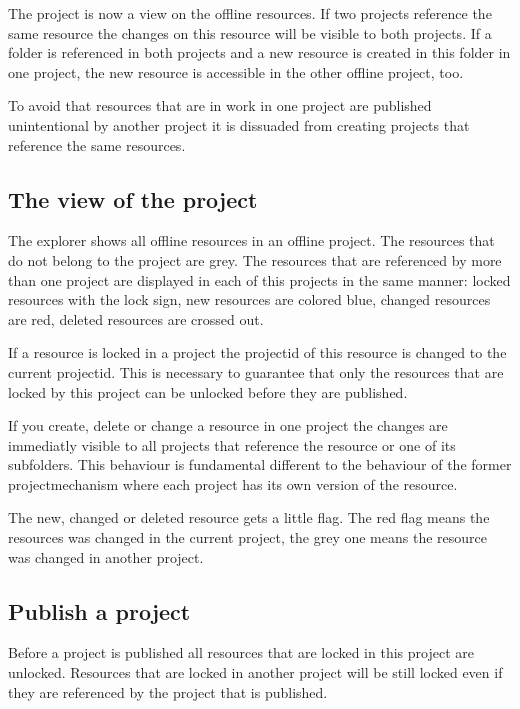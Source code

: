 The project is now a view on the offline resources. If two
projects reference the same resource the changes on this resource
will be visible to both projects. If a folder is referenced in
both projects and a new resource is created in this folder in one
project, the new resource is accessible in the other offline project, too.

To avoid that resources that are in work in one project are
published unintentional by another project it is dissuaded from
creating projects that reference the same resources.

\subsection{The view of the project}

The explorer shows all offline resources in an offline project.
The resources that do not belong to the project are grey. The
resources that are referenced by more than one project are
displayed in each of this projects in the same manner: locked
resources with the lock sign, new resources are colored blue,
changed resources are red, deleted resources are crossed out.

If a resource is locked in a project the projectid of this
resource is changed to the current projectid. This is necessary to
guarantee that only the resources that are locked by this project
can be unlocked before they are published.

If you create, delete or change a resource in one project the
changes are immediatly visible to all projects that reference the
resource or one of its subfolders. This behaviour is fundamental
different to the behaviour of the former projectmechanism where
each project has its own version of the resource.

The new, changed or deleted resource gets a little flag. The red
flag means the resources was changed in the current project, the
grey one means the resource was changed in another project.

\subsection{Publish a project}

Before a project is published all resources that are locked in
this project are unlocked. Resources that are locked in another
project will be still locked even if they are referenced by the
project that is published.


